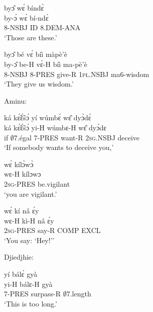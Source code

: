 \begin{exe} 
\exN\label{252}
  \glll byɔ̂ wɛ́ bíndɛ̀ \\
       by-ɔ́ wɛ́ bí-ndɛ̀ \\
         8-NSBJ ID 8.DEM-ANA \\
    \trans `Those are these.'
\end{exe}

\begin{exe} 
\exN\label{253}
  \glll byɔ̂ bé vɛ́ bíì màpè'è \\
        by-ɔ̂ be-H vɛ̀-H bíì ma-pè'è \\
        8-NSBJ 8-PRES give-R 1\textsc{pl}.NSBJ ma6-wisdom  \\
    \trans `They give us wisdom.'
\end{exe}

\noindent Aminu:

\begin{exe} 
\exN\label{254}
  \glll ká kɛ̃́ɛ̃́sɔ́ yí wúmbɛ́ wɛ̂ dyɔ̀dɛ̀ \\
        ká kɛ̃́ɛ̃́sɔ́ yi-H wúmbɛ-H wɛ̂ dyɔ̀dɛ \\
         if $\emptyset$7.égal 7-PRES want-R 2\textsc{sg}.NSBJ deceive \\
    \trans `If somebody wants to deceive you,'
\end{exe}

\begin{exe} 
\exN\label{255}
  \glll wɛ́ kílɔ̀wɔ̀ \\
        wɛ-H kílɔwɔ \\
         2\textsc{sg}-PRES be.vigilant \\
    \trans `you are vigilant.'
\end{exe}

\begin{exe} 
\exN\label{256}
  \glll wɛ́ kí nâ ɛ́y \\
       wɛ-H kì-H nâ ɛ́y \\
        2\textsc{sg}-PRES say-R COMP EXCL  \\
    \trans `You say: `Hey!''
\end{exe}

\noindent Djiedjhie:

\begin{exe} 
\exN\label{257}
  \glll yí bálɛ́ gyà \\
        yi-H bálɛ-H gyà \\
        7-PRES surpass-R $\emptyset$7.length   \\
    \trans `This is too long.'
\end{exe}













